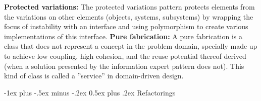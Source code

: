 \documentclass[a4paper, fontsize=6pt]{scrartcl}
\makeatletter
\renewcommand{\section}{\@startsection{section}{1}{0mm}%
    {-1ex plus -.5ex minus -.2ex}%
    {0.5ex plus .2ex}%
    {\normalfont\large\bfseries}}
\makeatother
\begin{document}
\begin{multicols*}{5}
\textbf{Protected variations:} The protected variations pattern protects elements from the variations on other elements (objects, systems, subsystems) by wrapping the focus of instability with an interface and using polymorphism to create various implementations of this interface.
\textbf{Pure fabrication:} A pure fabrication is a class that does not represent a concept in the problem domain, specially made up to achieve low coupling, high cohesion, and the reuse potential thereof derived (when a solution presented by the information expert pattern does not). This kind of class is called a ''service'' in domain-driven design.


\section{Refactorings}


\end{multicols*}
\end{document}
